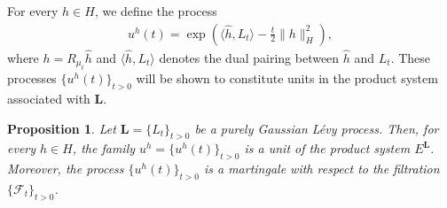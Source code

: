 \documentclass[11pt]{amsart}
\newtheorem{proposition}[theorem]{Proposition}
\theoremstyle{definition}
\theoremstyle{remark}
\numberwithin{equation}{section}
\begin{document}
For every \( h \in H \), we define the process
\begin{eqnarray}\label{ess1}
u^{h}(t) = \exp\left( \langle \hat{h}, L_t \rangle - \frac{t}{2} \| h \|_H^2 \right),
\end{eqnarray} where  \( h = R_{\mu_t} \hat{h} \) and \( \langle \hat{h}, L_t \rangle \) denotes the dual pairing between \( \hat{h} \) and \( L_t \).
These processes \( \{u^{h}(t)\}_{t > 0} \) will be shown to constitute units in the product system associated with  \( \bm{L}\).

\begin{proposition}\label{Lem1}
Let \( \bm{L} = \{L_t\}_{t > 0} \) be a purely Gaussian L\'evy process. Then, for every \( h \in H \), the family \( u^h = \{u^{h}(t)\}_{t > 0} \) is a unit of the product system \( E^{\bm{L}} \). Moreover, the process \( \{u^h(t)\}_{t > 0} \) is a martingale with respect to the filtration \( \{ \mathcal{F}_t \}_{t > 0} \).
\end{proposition}
\end{document}
